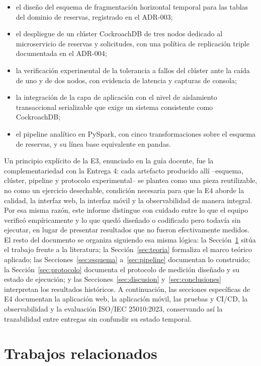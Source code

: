 \documentclass[10pt,twocolumn]{article}
\begin{document}
\begin{itemize}[leftmargin=*,itemsep=2pt]
  \item el diseño del esquema de fragmentación horizontal temporal para las
  tablas del dominio de reservas, registrado en el ADR-003;
  \item el despliegue de un clúster CockroachDB de tres nodos dedicado al
  microservicio de reservas y solicitudes, con una política de replicación
  triple documentada en el ADR-004;
  \item la verificación experimental de la tolerancia a fallos del clúster
  ante la caída de uno y de dos nodos, con evidencia de latencia y capturas
  de consola;
  \item la integración de la capa de aplicación con el nivel de
  aislamiento transaccional serializable que exige un sistema
  consistente como CockroachDB;
  \item el pipeline analítico en PySpark, con cinco transformaciones sobre
  el esquema de reservas, y su línea base equivalente en pandas.
\end{itemize}

Un principio explícito de la E3, enunciado en la guía docente, fue
la complementariedad con la Entrega 4: cada artefacto producido allí
--esquema, clúster, pipeline y protocolo experimental-- se plantea como
una pieza reutilizable, no como un ejercicio desechable, condición
necesaria para que la E4 aborde la calidad, la interfaz web, la interfaz
móvil y la observabilidad de manera integral.
Por esa misma razón, este informe distingue con
cuidado entre lo que el equipo verificó empíricamente y lo que quedó
diseñado o codificado pero todavía sin ejecutar, en lugar de presentar
resultados que no fueron efectivamente medidos. El resto del documento se
organiza siguiendo esa misma lógica: la Sección~\ref{sec:relacionados}
sitúa el trabajo frente a la literatura; la
Sección~\ref{sec:teoria} formaliza el marco teórico aplicado; las
Secciones~\ref{sec:esquema} a~\ref{sec:pipeline} documentan lo construido;
la Sección~\ref{sec:protocolo} documenta el protocolo de medición diseñado
y su estado de ejecución; y las
Secciones~\ref{sec:discusion} y~\ref{sec:conclusiones} interpretan los
resultados históricos. A continuación, las secciones específicas de E4
documentan la aplicación web, la aplicación móvil, las pruebas y CI/CD, la
observabilidad y la evaluación ISO/IEC 25010:2023, conservando así la
trazabilidad entre entregas sin confundir su estado temporal.

\section{Trabajos relacionados}
\label{sec:relacionados}
\end{document}
